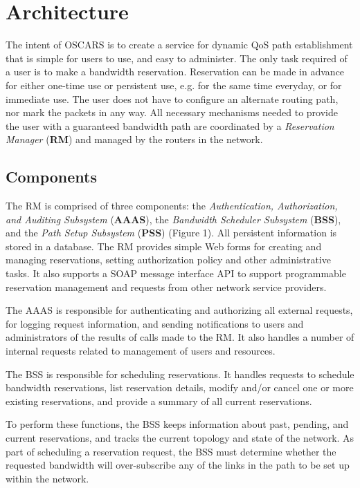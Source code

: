 \documentclass[conference]{IEEEtran}
\begin{document}
\section{Architecture}

The intent of OSCARS is to create a service for dynamic QoS path establishment
that is simple for users to use, and easy to administer.  The only task 
required of a user is to make a bandwidth reservation.  Reservation can be made 
in advance for either one-time use or persistent use, e.g. for the same time 
everyday, or for immediate use. The user does not have 
to configure an alternate routing path, nor mark the packets in any way.  All 
necessary mechanisms needed to provide the user with a guaranteed bandwidth 
path are coordinated by a  \emph{Reservation Manager} (\textbf{RM}) and 
managed by the routers in the network.

\subsection{Components}

The RM is comprised of three components:  the 
 \emph{Authentication, Authorization, and Auditing Subsystem} (\textbf{AAAS}), 
the  \emph{Bandwidth Scheduler Subsystem} (\textbf{BSS}), and the  \emph{Path 
Setup Subsystem} (\textbf{PSS}) (Figure 1). All persistent information is 
stored in a database.  
The RM provides simple Web forms for creating and managing reservations, 
setting authorization policy and other administrative tasks.
It also supports a SOAP message interface API to support programmable 
reservation management and requests from other network service providers.

The AAAS is responsible for authenticating and authorizing all external 
requests, for logging request information, and sending notifications to
users and administrators of the results of calls made to the RM.  It also
handles a number of internal requests related to management of users 
and resources.

The BSS is responsible for scheduling reservations.  It handles
requests to schedule bandwidth reservations, list reservation details,
modify and/or cancel one or more existing reservations, and provide a summary
of all current reservations.

To perform these functions, the BSS keeps information about past,
pending, and current reservations, and tracks the current topology and state of
the network.  As part of scheduling a reservation request, the BSS must
determine whether the requested bandwidth will over-subscribe any of the links
in the path to be set up within the network.
\end{document}
